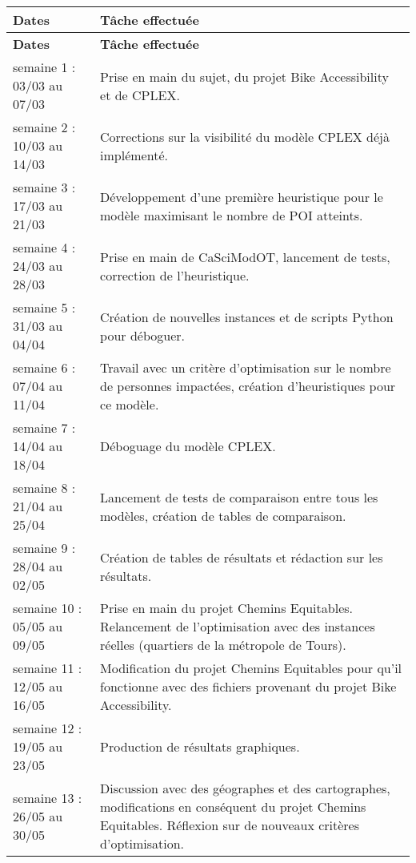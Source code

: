 \begin{longtable}[H]{| m{5cm} | m{10cm} |}
\hline
\textbf{Dates} & \textbf{Tâche effectuée}\\
\hline
\endfirsthead

\hline
\textbf{Dates} & \textbf{Tâche effectuée}\\
\hline
\endhead

\hline
\endfoot

\hline
\endlastfoot

semaine 1 : 03/03 au 07/03 & Prise en main du sujet, du projet Bike Accessibility et de CPLEX. \\
\hline
semaine 2 : 10/03 au 14/03 & Corrections sur la visibilité du modèle CPLEX déjà implémenté.\\
\hline
semaine 3 : 17/03 au 21/03 & Développement d'une première heuristique pour le modèle maximisant le nombre de POI atteints.\\
\hline
semaine 4 : 24/03 au 28/03 & Prise en main de CaSciModOT, lancement de tests, correction de l'heuristique.\\
\hline
semaine 5 : 31/03 au 04/04 & Création de nouvelles instances et de scripts Python pour déboguer.\\
\hline
semaine 6 : 07/04 au 11/04 & Travail avec un critère d'optimisation sur le nombre de personnes impactées, création d'heuristiques pour ce modèle. \\
\hline
semaine 7 : 14/04 au 18/04 & Déboguage du modèle CPLEX.\\
\hline
semaine 8 : 21/04 au 25/04 & Lancement de tests de comparaison entre tous les modèles, création de tables de comparaison.\\
\hline
semaine 9 : 28/04 au 02/05 & Création de tables de résultats et rédaction sur les résultats. \\
\hline
semaine 10 : 05/05 au 09/05 & Prise en main du projet Chemins Equitables. Relancement de l'optimisation avec des instances réelles (quartiers de la métropole de Tours). \\
\hline
semaine 11 : 12/05 au 16/05 & Modification du projet Chemins Equitables pour qu'il fonctionne avec des fichiers provenant du projet Bike Accessibility. \\
\hline
semaine 12 : 19/05 au 23/05 & Production de résultats graphiques. \\
\hline
semaine 13 : 26/05 au 30/05 & Discussion avec des géographes et des cartographes, modifications en conséquent du projet Chemins Equitables. Réflexion sur de nouveaux critères d'optimisation. \\

\end{longtable}

